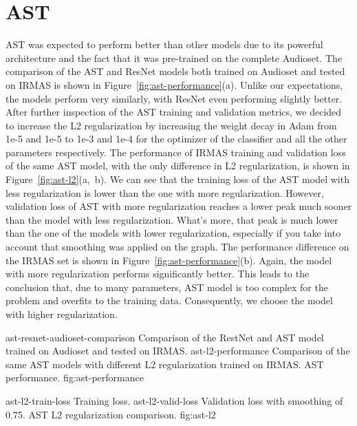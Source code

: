 \section{AST}
\label{sec:eval:ast}
AST was expected to perform better than other models due to its powerful architecture and the fact that it was pre-trained on the complete Audioset. The comparison of the AST and ResNet models both trained on Audioset and tested on IRMAS is shown in Figure~\ref{fig:ast-performance}(a). Unlike our expectations, the models perform very similarly, with ResNet even performing slightly better. After further inspection of the AST training and validation metrics, we decided to increase the L2 regularization by increasing the weight decay in Adam from 1e-5 and 1e-5 to 1e-3 and 1e-4 for the optimizer of the classifier and all the other parameters respectively. The performance of IRMAS training and validation loss of the same AST model, with the only difference in L2 regularization, is shown in Figure~\ref{fig:ast-l2}(a,~b). We can see that the training loss of the AST model with less regularization is lower than the one with more regularization. However, validation loss of AST with more regularization reaches a lower peak much sooner than the model with less regularization. What's more, that peak is much lower than the one of the models with lower regularization, especially if you take into account that smoothing was applied on the graph. The performance difference on the IRMAS set is shown in Figure~\ref{fig:ast-performance}(b). Again, the model with more regularization performs significantly better. This leads to the conclusion that, due to many parameters, AST model is too complex for the problem and overfits to the training data. Consequently, we choose the model with higher regularization.

\asideimages{14cm}{14cm}
	    {ast-resnet-audioset-comparison}
	    {Comparison of the RestNet and AST model trained on Audioset and tested on IRMAS.}
	    {ast-l2-performance}
	    {Comparison of the same AST models with different L2 regularization trained on IRMAS.}
	    {AST performance.}
	    {fig:ast-performance}

\asideimages{14cm}{14cm}
	    {ast-l2-train-loss}
	    {Training loss.}
	    {ast-l2-valid-loss}
	    {Validation loss with smoothing of 0.75.}
	    {AST L2 regularization comparison.}
	    {fig:ast-l2}


